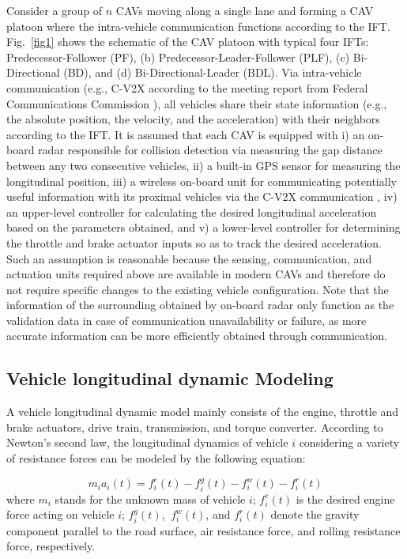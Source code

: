 \documentclass[a4paper]{cas-sc}
\begin{document}
Consider a group of $n$ CAVs moving along a single lane and forming a CAV platoon where the intra-vehicle communication functions according to the IFT. Fig.~\ref{fig1} shows the schematic of the CAV platoon with typical four IFTs: Predecessor-Follower (PF), (b) Predecessor-Leader-Follower (PLF), (c) Bi-Directional (BD), and (d) Bi-Directional-Leader (BDL). Via intra-vehicle communication (e.g., C-V2X according to the meeting report from Federal Communications Commission \citep{popeo2020federal}), all vehicles share their state information (e.g., the absolute position, the velocity, and the acceleration) with their neighbors according to the IFT. It is assumed that each CAV is equipped with i) an on-board radar responsible for collision detection via measuring the gap distance between any two consecutive vehicles, ii) a built-in GPS sensor for measuring the longitudinal position, iii) a wireless on-board unit for communicating potentially useful information with its proximal vehicles via the C-V2X communication \citep{VerizonNorth2020}, iv) an upper-level controller for calculating the desired longitudinal acceleration based on the parameters obtained, and v) a lower-level controller for determining the throttle and brake actuator inputs so as to track the desired acceleration. Such an assumption is reasonable because the sensing, communication, and actuation units required above are available in modern CAVs and therefore do not require specific changes to the existing vehicle configuration. Note that the information of the surrounding obtained by on-board radar only function as the validation data in case of communication unavailability or failure, as more accurate information can be more efficiently obtained through communication.

\subsection{Vehicle longitudinal dynamic Modeling}
\label{Section 3.1}

A vehicle longitudinal dynamic model mainly consists of the engine, throttle and brake actuators, drive train, transmission, and torque converter. According to Newton's second law, the longitudinal dynamics of vehicle $i$ considering a variety of resistance forces can be modeled by the following equation:

\begin{equation}
  m_ia_i(t)=f_i^e(t)-f_i^g(t)-f_i^w(t)-f_i^r(t)
  \label{eq1}
\end{equation}
where $m_i$ stands for the unknown mass of vehicle $i$; $f_i^e(t)$ is the desired engine force acting on vehicle $i$; $f_i^g(t)$, $\ f_i^w(t)$, and $f_i^r(t)$ denote the gravity component parallel to the road surface, air resistance force, and rolling resistance force, respectively.
\end{document}
